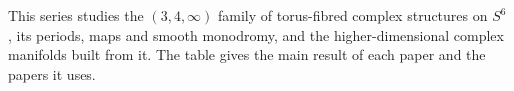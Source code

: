 This series studies the $(3,4,\infty)$ family of torus-fibred complex
structures on $S^6$ \citep{AC2026,Engel2026}, its periods, maps and smooth
monodromy, and the higher-dimensional complex manifolds built from it.
The table gives the main result of each paper and the papers it uses.
